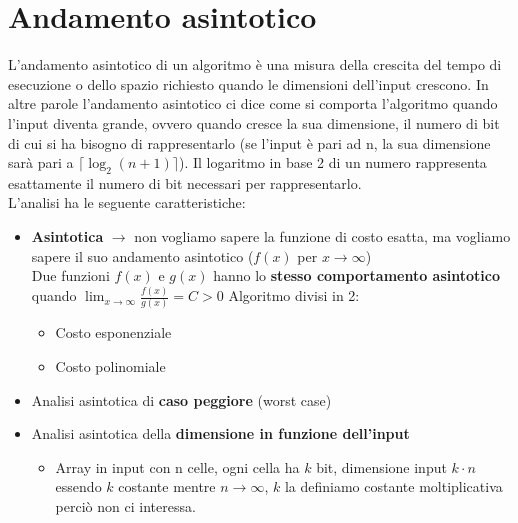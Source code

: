 \section{Andamento asintotico}
L'andamento asintotico di un algoritmo è una misura della crescita del tempo di esecuzione o dello spazio richiesto quando le dimensioni dell'input crescono. In altre parole l'andamento asintotico ci dice come si comporta l'algoritmo quando l'input diventa grande, ovvero quando cresce la sua dimensione, il numero di bit di cui si ha bisogno di rappresentarlo (se l'input è pari ad n, la sua dimensione sarà pari a $\lceil \log_2(n+1) \rceil$). Il logaritmo in base 2 di un numero rappresenta esattamente il numero di bit necessari per rappresentarlo.\\

\noindent L'analisi ha le seguente caratteristiche:
\begin{itemize}
    \item \textbf{Asintotica} $\rightarrow$ non vogliamo sapere la funzione di costo esatta, ma vogliamo sapere il suo andamento asintotico ($f(x)$ per $x\to \infty$)\smallskip\\
    Due funzioni $f(x)$ e $g(x)$ hanno lo \textbf{stesso comportamento asintotico} quando $ \displaystyle \lim_{x\to\infty} \frac{f(x)}{g(x)} = C > 0$
    Algoritmo divisi in 2:
    \begin{itemize}
        \item Costo esponenziale
        \item Costo polinomiale
    \end{itemize}

    \item Analisi asintotica di \textbf{caso peggiore} (worst case)

    \item Analisi asintotica della \textbf{dimensione in funzione dell’input} 
    \begin{itemize}
        \item Array in input con n celle, ogni cella ha $k$ bit, dimensione input $k \cdot n$ essendo $k$ costante mentre $n \to \infty$, $k$ la definiamo costante moltiplicativa perciò non ci interessa.
    \end{itemize}
    
\end{itemize}

